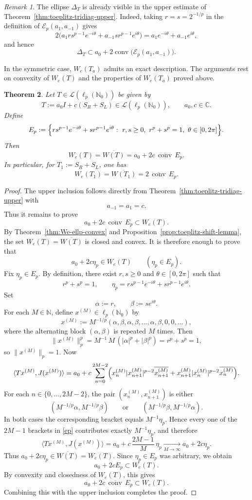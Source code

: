 \documentclass[11pt]{amsart}
\numberwithin{equation}{section}
\newtheorem{theorem}{Theorem}[section]
\theoremstyle{definition}
\theoremstyle{remark}
\newtheorem{remark}[theorem]{Remark}
\DeclareMathOperator{\conv}{conv}
\newcommand{\C}{\mathbb{C}}
\newcommand{\ip}[2]{\langle #1,#2\rangle}
\newcommand{\We}{W_e}
\begin{document}
\begin{remark}
The ellipse $\Delta_T$ is already visible in the upper estimate of
Theorem~\ref{thm:toeplitz-tridiag-upper}. Indeed, taking
$r=s=2^{-1/p}$ in the definition of $\mathcal E_p(a_1,a_{-1})$ gives
\[
        2\bigl(a_1rs^{p-1}e^{-i\theta}+a_{-1}sr^{p-1}e^{i\theta}\bigr)
        =a_1e^{-i\theta}+a_{-1}e^{i\theta},
\]
and hence
\[
        \Delta_T\subset a_0+2\conv\bigl(\mathcal E_p(a_1,a_{-1})\bigr).
\]
\end{remark}
In the symmetric case, $W_e(T_a)$ admits an exact description. The arguments rest on convexity of $W_e(T)$
and the properties of $W_e(T_a)$ proved above.
\begin{theorem}
\label{thm:toeplitz-symmetric-exact}
Let $T \in \mathcal L(\ell_p(\mathbb N_0))$ be given by
\[
T:=a_0I+c(S_R+S_L)\in \mathcal L(\ell_p(\mathbb N_0)),
\qquad a_0,c\in\C.
\]
Define
\[
E_p:=\Bigl\{rs^{p-1}e^{-i\theta}+sr^{p-1}e^{i\theta}:\ r,s\ge0,\ r^p+s^p=1,\ \theta\in[0,2\pi]\Bigr\}.
\]
Then
\[
\We(T)=\overline{W(T)}=a_0+2c\,\overline{\conv}\,E_p.
\]
In particular, for $T_1:=S_R+S_L$, one has
\[
\We(T_1)=\overline{W(T_1)}=2\,\overline{\conv}\,E_p.
\]
\end{theorem}

\begin{proof}
The upper inclusion follows directly from Theorem~\ref{thm:toeplitz-tridiag-upper} with
\[
a_{-1}=a_1=c.
\]
Thus it remains to prove
\[
a_0+2c\,\overline{\conv}\,E_p\subset \We(T).
\]
By Theorem~\ref{thm:We-ellp-convex} and Proposition~\ref{prop:toeplitz-shift-lemma}, the set $\We(T)=\overline{W(T)}$ is closed and convex.
It is therefore enough to prove that
\[
a_0+2c\eta_p\in \We(T)
\qquad (\eta_p\in E_p).
\]
Fix $\eta_p\in E_p$. By definition, there exist $r,s\ge0$ and $\theta\in[0,2\pi]$ such that
\[
r^p+s^p=1,
\qquad
 \eta_p=rs^{p-1}e^{-i\theta}+sr^{p-1}e^{i\theta}.
\]
Set
\[
\alpha:=r,
\qquad
\beta:=se^{i\theta}.
\]
For each $M\in\mathbb N$, define $x^{(M)}\in\ell_p(\mathbb N_0)$ by
\[
x^{(M)}:=M^{-1/p}(\alpha,\beta,\alpha,\beta,\dots,\alpha,\beta,0,0,\dots),
\]
where the alternating block $(\alpha,\beta)$ is repeated $M$ times. Then
\[
\|x^{(M)}\|_p^p
=M^{-1}\,M\,(|\alpha|^p+|\beta|^p)=r^p+s^p=1,
\]
so $\|x^{(M)}\|_p=1$.
Now
\begin{equation}\label{ep}
\ip{Tx^{(M)}}{J(x^{(M)})}
=a_0+c\sum_{n=0}^{2M-2}
\Bigl(x^{(M)}_n|x^{(M)}_{n+1}|^{p-2}\overline{x^{(M)}_{n+1}}
+x^{(M)}_{n+1}|x^{(M)}_n|^{p-2}\overline{x^{(M)}_n}\Bigr).
\end{equation}
For each $n\in\{0,\dots,2M-2\}$, the pair $(x^{(M)}_n,x^{(M)}_{n+1})$ is either
\[
(M^{-1/p}\alpha,M^{-1/p}\beta)
\qquad\text{or}\qquad
(M^{-1/p}\beta,M^{-1/p}\alpha).
\]
In both cases the corresponding bracket equals $M^{-1}\eta_p$. Hence every one of the $2M-1$ brackets in \eqref{ep} contributes exactly $M^{-1}\eta_p$, and therefore
\[
\ip{Tx^{(M)}}{J(x^{(M)})}
=a_0+c\,\frac{2M-1}{M}\,\eta_p
\xrightarrow[M\to\infty]{}
a_0+2c\eta_p.
\]
Thus $a_0+2c\eta_p\in\overline{W(T)}=\We(T)$. Since $\eta_p\in E_p$ was arbitrary, we obtain
\[
a_0+2cE_p\subset \We(T).
\]
By convexity and closedness of $\We(T)$, this gives
\[
a_0+2c\,\overline{\conv}\,E_p\subset \We(T).
\]
Combining this with the upper inclusion completes the proof.
\end{proof}
\end{document}
